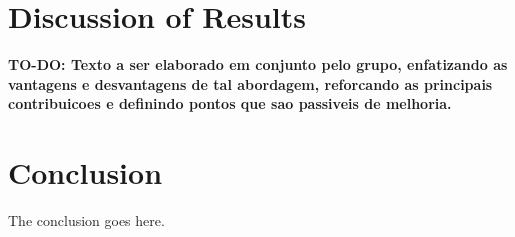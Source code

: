\documentclass[sigplan]{acmart}
\begin{document}
\section{Discussion of Results}
\textbf{TO-DO: Texto a ser elaborado em conjunto pelo grupo, enfatizando as vantagens e desvantagens de tal abordagem, reforcando as principais contribuicoes e definindo pontos que sao passiveis de melhoria.}

\section{Conclusion}
The conclusion goes here.


 
\end{document}
